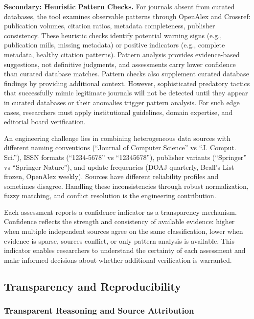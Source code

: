\documentclass[fleqn,10pt]{SelfArx}
\begin{document}
\textbf{Secondary: Heuristic Pattern Checks.} For journals absent from
curated databases, the tool examines observable patterns through
OpenAlex and Crossref: publication volumes, citation ratios, metadata
completeness, publisher consistency. These heuristic checks identify
potential warning signs (e.g., publication mills, missing metadata)
or positive indicators (e.g., complete metadata, healthy citation
patterns). Pattern analysis provides evidence-based suggestions, not
definitive judgments, and assessments carry lower confidence than
curated database matches. Pattern checks also supplement curated
database findings by providing additional context. However,
sophisticated predatory tactics that successfully mimic legitimate
journals will not be detected until they appear in curated databases or
their anomalies trigger pattern analysis. For such edge cases,
researchers must apply institutional guidelines, domain expertise, and
editorial board verification.

An engineering challenge lies in combining heterogeneous data sources
with different naming conventions (``Journal of Computer Science'' vs
``J. Comput.  Sci.''), ISSN formats (``1234-5678'' vs ``12345678''),
publisher variants (``Springer'' vs ``Springer Nature''), and update
frequencies (DOAJ quarterly, Beall's List frozen, OpenAlex
weekly). Sources have different reliability profiles and sometimes
disagree. Handling these inconsistencies through robust normalization,
fuzzy matching, and conflict resolution is the engineering
contribution.

Each assessment reports a confidence indicator as a transparency
mechanism. Confidence reflects the strength and consistency of
available evidence: higher when multiple independent sources agree on
the same classification, lower when evidence is sparse, sources
conflict, or only pattern analysis is available. This indicator enables
researchers to understand the certainty of each assessment and make
informed decisions about whether additional verification is warranted.

\subsection{Transparency and Reproducibility}
\label{sec:transparency}

\subsubsection{Transparent Reasoning and Source Attribution}
\end{document}
